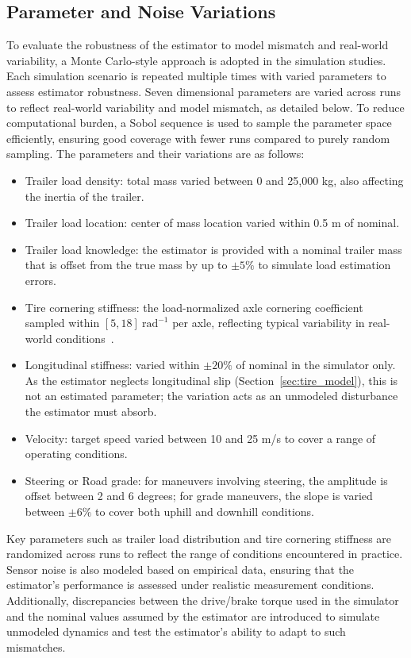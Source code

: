 \documentclass[conference]{IEEEtran}
\begin{document}
\subsection{Parameter and Noise Variations}
To evaluate the robustness of the estimator to model mismatch and real-world variability, a Monte Carlo-style approach is adopted in the simulation studies. Each simulation scenario is repeated multiple times with varied parameters to assess estimator robustness. Seven dimensional parameters are varied across runs to reflect real-world variability and model mismatch, as detailed below. To reduce computational burden, a Sobol sequence is used to sample the parameter space efficiently, ensuring good coverage with fewer runs compared to purely random sampling. The parameters and their variations are as follows:
\begin{itemize}
    \item Trailer load density: total mass varied between 0 and 25,000 kg, also affecting the inertia of the trailer. 
    \item Trailer load location: center of mass location varied within 0.5 m of nominal.
    \item Trailer load knowledge: the estimator is provided with a nominal trailer mass that is offset from the true mass by up to $\pm 5\%$ to simulate load estimation errors.
    \item Tire cornering stiffness: the load-normalized axle cornering coefficient sampled within $[5, 18]~\mathrm{rad}^{-1}$ per axle, reflecting typical variability in real-world conditions~\cite{hjort_tyre_2021}.
    \item Longitudinal stiffness: varied within $\pm 20\%$ of nominal in the simulator only. As the estimator neglects longitudinal slip (Section~\ref{sec:tire_model}), this is not an estimated parameter; the variation acts as an unmodeled disturbance the estimator must absorb.
    \item Velocity: target speed varied between 10 and 25 m/s to cover a range of operating conditions.
    \item Steering or Road grade: for maneuvers involving steering, the amplitude is offset between 2 and 6 degrees; for grade maneuvers, the slope is varied between $\pm 6\%$ to cover both uphill and downhill conditions.
\end{itemize}

Key parameters such as trailer load distribution and tire cornering stiffness are randomized across runs to reflect the range of conditions encountered in practice. Sensor noise is also modeled based on empirical data, ensuring that the estimator's performance is assessed under realistic measurement conditions. Additionally, discrepancies between the drive/brake torque used in the simulator and the nominal values assumed by the estimator are introduced to simulate unmodeled dynamics and test the estimator's ability to adapt to such mismatches.
\end{document}
